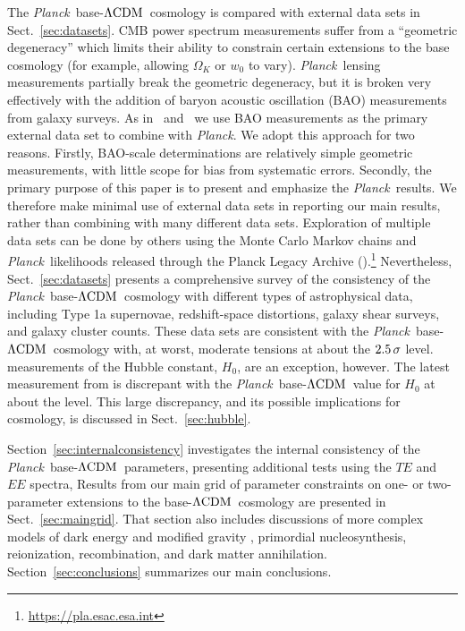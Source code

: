 \documentclass[longauth,traditabstract]{aa}
\def\Planck{\textit{Planck}}
\def\,{\thinspace}
\providecommand{\LCDM}{{$\rm{\Lambda CDM}$}}
\newcommand{\paramsI}{\citetalias{planck2013-p11}}
\newcommand{\paramsII}{\citetalias{planck2014-a15}}
\newcommand{\PLA}{\citetalias{PLA}}
\begin{document}
The \Planck\ base-\LCDM\ cosmology is compared with external data sets
in Sect.~\ref{sec:datasets}. CMB power spectrum measurements suffer
from a ``geometric degeneracy'' \citep[see][]{Efstathiou:1999} which
limits their ability to constrain certain extensions to the base cosmology
(for example, allowing $\Omega_K$ or $w_0$ to vary).  \Planck\ lensing
measurements partially break the geometric degeneracy, but it is
broken very effectively with the addition of baryon acoustic oscillation
(BAO) measurements from
galaxy surveys. As in \paramsI\ and \paramsII\ we use BAO measurements
as the primary external data set to combine with \Planck.  We adopt
this approach for two reasons. Firstly, BAO-scale determinations are
relatively simple geometric measurements, with little scope for bias
from systematic errors. Secondly, the primary purpose of this paper
is to present and emphasize the \Planck\ results. We therefore make
minimal use of external data sets in reporting our main results, rather
than combining with many different data sets. Exploration of multiple
data sets can be done by others using the Monte Carlo Markov chains and
\Planck\ likelihoods released through the Planck Legacy Archive
(\PLA).\footnote{\url{https://pla.esac.esa.int}} Nevertheless,
Sect.~\ref{sec:datasets} presents a comprehensive survey of the
consistency of the \Planck\ base-\LCDM\ cosmology with different types
of astrophysical data, including Type 1a supernovae, redshift-space
distortions, galaxy shear surveys, and galaxy cluster counts. These
data sets are consistent with the
\Planck\ base-\LCDM\ cosmology with, at worst, moderate tensions at about the
$2.5\,\sigma$ level.  measurements of the Hubble constant, $H_0$,
are an exception, however. The latest measurement from \citet{Riess:2019cxk}
is discrepant with the \Planck\ base-\LCDM\ value for $H_0$ at about the
\rep{$4.4\,\sigma$} level. This large discrepancy, and its possible implications for cosmology, is discussed in Sect.~\ref{sec:hubble}.

Section~\ref{sec:internalconsistency} investigates the internal
consistency of the \Planck\ base-\LCDM\ parameters, presenting
additional tests using the $TE$ and $EE$ spectra,   Results from our main
grid of parameter constraints on one- or two-parameter extensions to
the base-\LCDM\ cosmology are presented in Sect.~\ref{sec:maingrid}. That
section also includes discussions of more complex models of dark
energy and modified gravity \citep[updating the results presented
in][]{planck2014-a16}, primordial nucleosynthesis, reionization,
recombination, and dark matter
annihilation. Section~\ref{sec:conclusions} summarizes our main
conclusions.
\end{document}
